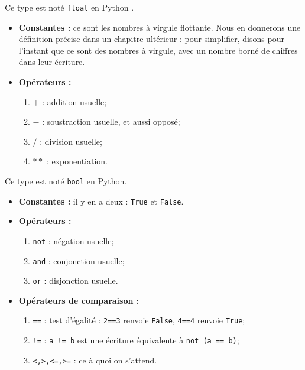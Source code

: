 \begin{defi}[Flottants]
Ce type est noté \lstinline{float} en Python .
\begin{itemize}
\item  \textbf{Constantes :} ce sont les {nombres à virgule flottante}. Nous en
donnerons une définition précise dans un chapitre ultérieur : pour simplifier, disons pour 
l'instant que ce sont des nombres à virgule, avec un nombre borné de chiffres dans leur écriture.
\item \textbf{Opérateurs : }
\begin{enumerate}
 \item $+$ : addition usuelle;
 \item $-$ : soustraction usuelle, et aussi opposé;
\item  $/$ : division usuelle;
\item $**$ : exponentiation. %
\end{enumerate}
\end{itemize}
\end{defi}



\begin{defi}[Expression -- Booléen]
Ce type est noté \lstinline{bool} en Python.
\begin{itemize}
\item \textbf{Constantes :} il y en a deux : \lstinline{True} et \lstinline{False}.
\item \textbf{Opérateurs :}
\begin{enumerate}
 \item \lstinline{not} : négation usuelle;
 \item \lstinline{and} : conjonction usuelle;
 \item \lstinline{or} : disjonction usuelle.
\end{enumerate}
\item \textbf{Opérateurs de comparaison :}
\begin{enumerate}
 \item \lstinline{==} : test d'égalité : \lstinline{2==3} renvoie \lstinline{False}, \lstinline{4==4} renvoie 
\lstinline{True}; %
 \item \lstinline{!=} : \lstinline{a != b} est une écriture équivalente à \lstinline{not (a == b)};
 \item \lstinline{<,>,<=,>=} : ce à quoi on s'attend.
\end{enumerate}
\end{itemize}
\end{defi}


